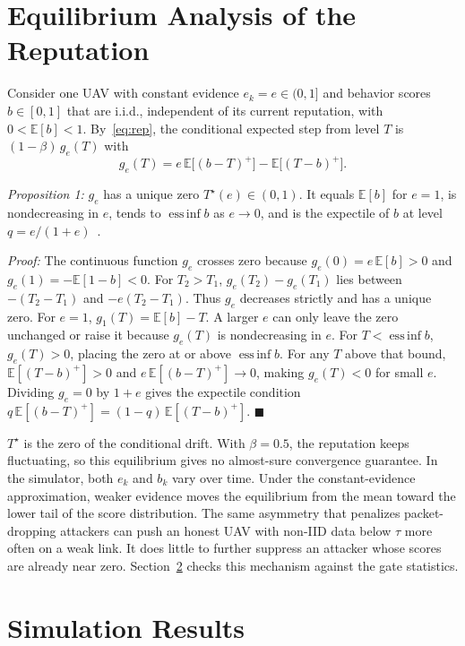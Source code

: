 \documentclass[journal]{IEEEtran}
\begin{document}
\section{Equilibrium Analysis of the Reputation}
\label{sec:analysis}
Consider one UAV with constant evidence $e_k=e\in(0,1]$ and behavior scores
$b\in[0,1]$ that are i.i.d., independent of its current reputation, with
$0<\mathbb{E}[b]<1$. By~\eqref{eq:rep}, the conditional expected step from level $T$
is $(1-\beta)\,g_e(T)$ with
\begin{equation}
  g_e(T)=e\,\mathbb{E}\bigl[(b-T)^+\bigr]-\mathbb{E}\bigl[(T-b)^+\bigr].
  \label{eq:drift}
\end{equation}

\emph{Proposition 1:} $g_e$ has a unique zero $T^\star(e)\in(0,1)$. It equals
$\mathbb{E}[b]$ for $e=1$, is nondecreasing in $e$, tends to
$\operatorname{ess\,inf} b$ as $e\to0$, and is the expectile of $b$ at level
$q=e/(1+e)$~\cite{newey1987expectile}.

\emph{Proof:} The continuous function $g_e$ crosses zero because
$g_e(0)=e\,\mathbb{E}[b]>0$ and $g_e(1)=-\mathbb{E}[1-b]<0$. For $T_2>T_1$,
$g_e(T_2)-g_e(T_1)$ lies between $-(T_2-T_1)$ and $-e(T_2-T_1)$. Thus $g_e$ decreases
strictly and has a unique zero. For $e=1$, $g_1(T)=\mathbb{E}[b]-T$. A larger $e$
can only leave the zero unchanged or raise it because $g_e(T)$ is nondecreasing in
$e$. For $T<\operatorname{ess\,inf}b$, $g_e(T)>0$, placing the zero at or above
$\operatorname{ess\,inf}b$. For any $T$ above that bound, $\mathbb{E}[(T-b)^+]>0$ and
$e\,\mathbb{E}[(b-T)^+]\to0$, making $g_e(T)<0$ for small $e$. Dividing $g_e=0$ by
$1+e$ gives the expectile condition
$q\,\mathbb{E}[(b-T)^+]=(1-q)\,\mathbb{E}[(T-b)^+]$. \hfill$\blacksquare$

$T^\star$ is the zero of the conditional drift. With $\beta=0.5$, the reputation
keeps fluctuating, so this equilibrium gives no almost-sure convergence guarantee.
In the simulator, both $e_k$ and $b_k$ vary over time. Under the constant-evidence
approximation, weaker evidence moves the equilibrium
from the mean toward the lower tail of the score distribution. The same asymmetry
that penalizes packet-dropping attackers can push an honest UAV with non-IID data
below $\tau$ more often on a weak link. It does little to further suppress an attacker
whose scores are already near zero. Section~\ref{sec:results} checks this mechanism
against the gate statistics.

\section{Simulation Results}
\label{sec:results}
\end{document}
